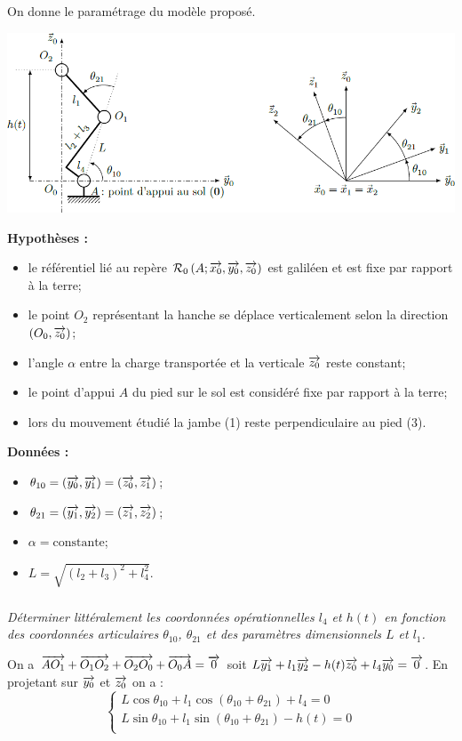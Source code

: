 \documentclass[10pt,fleqn]{article} %
\begin{document}
\begin{multicols}{2}
On donne le paramétrage du modèle proposé. 

\begin{center}
\includegraphics[width=\linewidth]{images/fig_04}
\end{center}

\textbf{Hypothèses : }
\begin{itemize}
\item le référentiel lié au repère $\mathcal{R}_0\left(A;\overrightarrow{x_0},\overrightarrow{y_0},\overrightarrow{z_0} \right)$ est galiléen et est fixe par rapport à la terre;
\item le point $O_2$ représentant la hanche se déplace verticalement selon la direction $\left(O_0,\overrightarrow{z_0}\right)$;
\item l’angle $\alpha$ entre la charge transportée et la verticale $\overrightarrow{z_0}$ reste constant;
\item le point d’appui $A$ du pied sur le sol est considéré fixe par rapport à la terre;
\item lors du mouvement étudié la jambe (1) reste perpendiculaire au pied (3).
\end{itemize}

\textbf{Données : }
\begin{itemize}
\item $\theta_{10}=\left(\overrightarrow{y_0},\overrightarrow{y_1}\right)=\left(\overrightarrow{z_0},\overrightarrow{z_1}\right)$;
\item $\theta_{21}=\left(\overrightarrow{y_1},\overrightarrow{y_2}\right)=\left(\overrightarrow{z_1},\overrightarrow{z_2}\right)$;
\item $\alpha=\text{constante}$;
\item $L=\sqrt{\left(l_2+l_3\right)^2+l_4^2}$.
\end{itemize}

\fi

\subparagraph{}\textit{Déterminer littéralement les coordonnées opérationnelles $l_4$ et $h(t)$ en fonction des coordonnées articulaires $\theta_{10}$, $\theta_{21}$ et des paramètres dimensionnels $L$ et $l_1$.}
\ifprof
\begin{corrige}
On a $\overrightarrow{A O_1}+\overrightarrow{O_1 O_2}+\overrightarrow{O_2 O_0}+\overrightarrow{O_0 A}=\overrightarrow{0}$ soit 
$L\overrightarrow{y_1}+l_1\overrightarrow{y_2}-h(t)\overrightarrow{z_0}+l_4\overrightarrow{y_0}=\overrightarrow{0}$. 
En projetant sur $\overrightarrow{y_0}$ et $\overrightarrow{z_0}$ on a :
$$
\left\{
\begin{array}{l}
L\cos\theta_{10} +l_1\cos\left(\theta_{10}+\theta_{21}\right)+l_4={0} \\
L\sin\theta_{10}  +l_1\sin\left(\theta_{10}+\theta_{21}\right)-h(t) ={0} \\
\end{array}
\right.
$$


\end{corrige}
\end{multicols}
\end{document}
